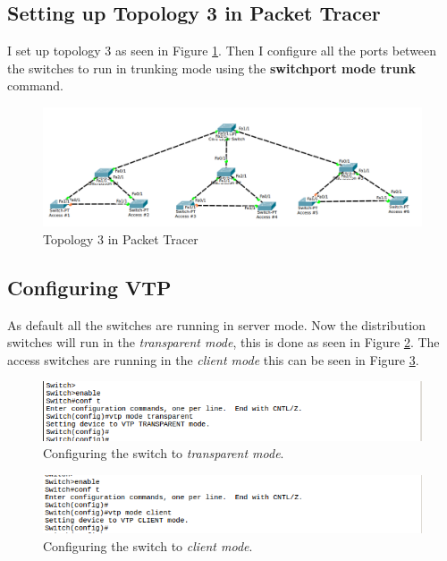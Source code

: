 \documentclass{article}
\begin{document}
\subsection{Setting up Topology 3 in Packet Tracer}

I set up topology 3 as seen in Figure \ref{fig:3top}. Then I configure all the ports between the switches to run in trunking mode using the \textbf{switchport mode trunk}
command. 
\begin{figure}[h]
    \centering
    \includegraphics[scale=0.4,width=\textwidth]{3top}
    \caption{Topology 3 in Packet Tracer}
    \label{fig:3top}
\end{figure}

\subsection{Configuring VTP}

As default all the switches are running in server mode. Now the distribution switches will run in the \textit{transparent mode}, this is done as seen in Figure \ref{fig:vtptransparent}. The access switches are running in the \textit{client mode} this can be seen in Figure \ref{fig:vtpclient}. 

\begin{figure}[h]
\centering
    \includegraphics[width=\textwidth]{vtptransparent}
    \caption{Configuring the switch to \textit{transparent mode}.}
    \label{fig:vtptransparent}
\end{figure}
    
\begin{figure}[h]
\centering
    \includegraphics[width=\textwidth]{vtpclient}
    \caption{Configuring the switch to \textit{client mode}.}
    \label{fig:vtpclient}    
\end{figure}
\end{document}
